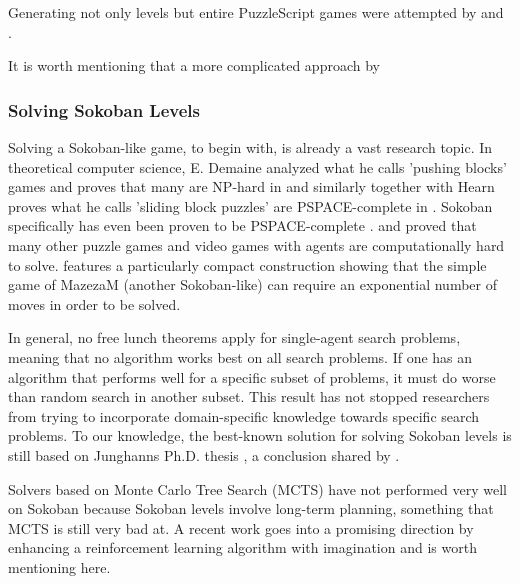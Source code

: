 Generating not only levels but entire PuzzleScript games were attempted by \cite{Khalifa2015} and \cite{Lim2014}. 

It is worth mentioning that a more complicated approach by 

\subsubsection{Solving Sokoban Levels}

Solving a Sokoban-like game, to begin with, is already a vast research topic. In theoretical computer science, E. Demaine analyzed what he calls 'pushing blocks' games and proves that many are NP-hard in \cite{Demaine2003} and similarly together with Hearn proves what he calls 'sliding block puzzles' are PSPACE-complete in \cite{Hearn2005}. Sokoban specifically has even been proven to be PSPACE-complete \cite{Culberson1997}. \cite{Viglietta2014} and \cite{Hard2015} proved that many other puzzle games and video games with agents are computationally hard to solve. \cite{Williams2017} features a particularly compact construction showing that the simple game of MazezaM (another Sokoban-like) can require an exponential number of moves in order to be solved. %

In general, no free lunch theorems apply for single-agent search problems, meaning that no algorithm works best on all search problems. If one has an algorithm that performs well for a specific subset of problems, it must do worse than random search in another subset. This result has not stopped researchers from trying to incorporate domain-specific knowledge towards specific search problems. To our knowledge, the best-known solution for solving Sokoban levels is still based on Junghanns Ph.D. thesis \cite{Junghanns1999}, a conclusion shared by \cite{Froleyks2016}.

Solvers based on Monte Carlo Tree Search (MCTS) have not performed very well on Sokoban because Sokoban levels involve long-term planning, something that MCTS is still very bad at. A recent work \cite{Weber2017} goes into a promising direction by enhancing a reinforcement learning algorithm with imagination and is worth mentioning here.


